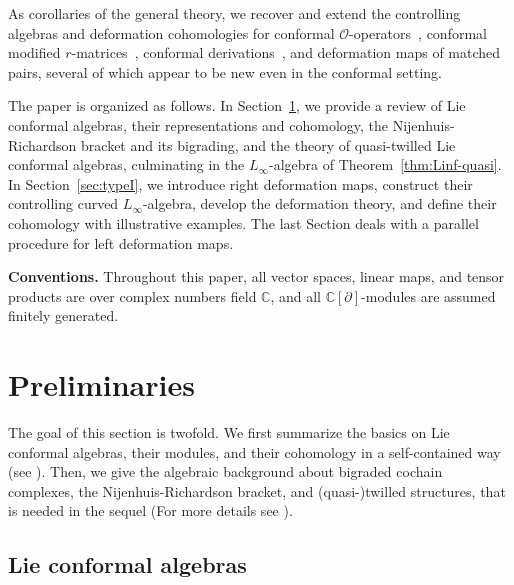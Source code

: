 \documentclass[a4paper,11pt]{article}
\def\Rg{\mathbb{C}[\partial]}
\def\C{\mathbb{C}}
\numberwithin{equation}{section}
\begin{document}
As corollaries of the general theory, we recover and extend the
controlling algebras and deformation cohomologies for conformal
$\mathcal{O}$-operators~\cite{YL},
conformal modified $r$-matrices~\cite{JS2}, conformal
derivations~\cite{TFS}, and deformation maps of matched pairs, several  
of which appear to be new even in the conformal setting.

\medskip
The paper is organized as follows. In Section~\ref{sec:prelim}, we provide a review of  Lie conformal algebras, their representations 
and cohomology, the Nijenhuis-Richardson bracket and its bigrading, and
the theory of quasi-twilled Lie conformal  algebras, culminating in the
$L_\infty$-algebra of Theorem~\ref{thm:Linf-quasi}.
In Section~\ref{sec:typeI}, we  introduce right deformation maps, construct
their controlling curved $L_\infty$-algebra, develop the deformation
theory, and define their cohomology with illustrative examples.
The last Section deals with a parallel procedure for left
deformation maps.

\medskip
\noindent\textbf{Conventions.}
Throughout this paper, all vector spaces, linear maps, and tensor products are over complex numbers field
$\C$, and all $\Rg$-modules are assumed finitely generated.

\section{Preliminaries}\label{sec:prelim}

The goal of this section is twofold. We first summarize the basics on  Lie conformal algebras, their modules, and their cohomology
in a self-contained way (see \cite{D'AndreaKac, KAC, KAC2, DK113}). Then, we give the algebraic background about bigraded cochain complexes, the Nijenhuis-Richardson bracket, and
(quasi-)twilled structures, that is needed in the sequel (For more details see \cite{Wu, YL, DK3}). 



\subsection{Lie conformal algebras}\label{subsec:conf-alg}
\end{document}
